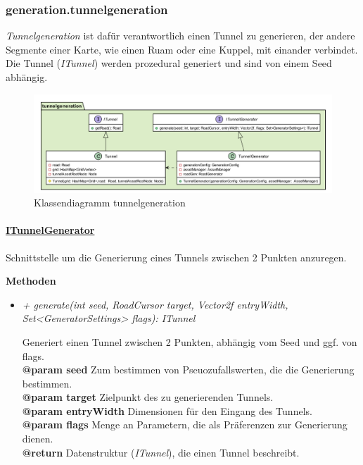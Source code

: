 \subsubsection{generation.tunnelgeneration}
    \textit{Tunnelgeneration} ist dafür verantwortlich einen Tunnel zu generieren, der andere Segmente einer Karte, 
    wie einen Ruam oder eine Kuppel, mit einander verbindet. Die Tunnel (\textit{ITunnel}) werden prozedural generiert 
    und sind von einem Seed abhängig.\par

    \begin{figure}[htbp]
        \centering
        \includegraphics[width=\linewidth]{./Generierung/Bilder/tunnelgeneration.png}
        \caption{Klassendiagramm tunnelgeneration}
    \end{figure}


        \paragraph{\underline{ITunnelGenerator}} \mbox{}\par
            Schnittstelle um die Generierung eines Tunnels zwischen 2 Punkten anzuregen.\par
            
            \textbf{Methoden}					
            \begin{itemize}
                \item  \textit{+ generate(int seed, RoadCursor target, Vector2f entryWidth, Set<GeneratorSettings> flags): ITunnel}
                    \begin{leftbar}[0.9\linewidth]
                        Generiert einen Tunnel zwischen 2 Punkten, abhängig vom Seed und ggf. von flags.\\
                        \textbf{@param seed} Zum bestimmen von Pseuozufallswerten, die die Generierung bestimmen.\\
                        \textbf{@param target} Zielpunkt des zu generierenden Tunnels.\\
                        \textbf{@param entryWidth} Dimensionen für den Eingang des Tunnels.\\
                        \textbf{@param flags} Menge an Parametern, die als Präferenzen zur Generierung dienen.\\
                        \textbf{@return} Datenstruktur (\textit{ITunnel}), die einen Tunnel beschreibt.
                    \end{leftbar}   
            \end{itemize}
    
